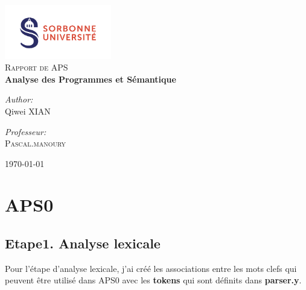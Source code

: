 \documentclass[14px]{article}
\begin{document}
	\setlength{\parindent}{0pt}
	\begin{titlepage}
		
		\begin{center}
			\includegraphics[width=0.35\textwidth]{logo.png}\\[1cm]
			
			\textsc{\Large Rapport de APS}\\[0.5cm]
			
			
			{ \huge \bfseries Analyse des Programmes et Sémantique}\\[0.4cm]
			
			\begin{minipage}{0.4\textwidth}
				\begin{flushleft} \large
					\emph{Author:}\\
					Qiwei \textsc{XIAN}
				\end{flushleft}
			\end{minipage}
			\begin{minipage}{0.4\textwidth}
				\begin{flushright} \large
					\emph{Professeur:} \\
					\textsc{Pascal.manoury}
				\end{flushright}
			\end{minipage}
			
			\vfill
			{\large \today}
		\end{center}
		
	\end{titlepage}
	\clearpage
	
	\tableofcontents
	\thispagestyle{empty}
	\clearpage
	
	\pagestyle{fancy}
	\rhead{\thepage}
	\fancyfoot{}
	
\section{APS0}
\subsection{Etape1. Analyse lexicale}
Pour l'étape d'analyse lexicale, j'ai créé les associations entre les mots clefs qui peuvent être utilisé dans APS0 avec les \textbf{tokens} qui sont définits dans \textbf{parser.y}.
\end{document}
